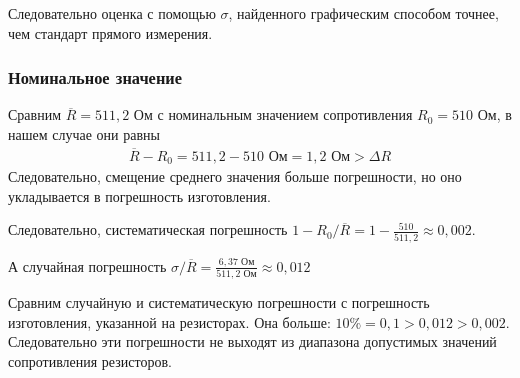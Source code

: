 Следовательно оценка с помощью $\sigma$, найденного графическим способом точнее, чем стандарт прямого измерения.

\subsubsection{Номинальное значение}

Сравним $\overline{R} = 511,2 \text{ Ом}$ с номинальным значением сопротивления $R_0 = 510 \text{ Ом}$, в нашем случае они равны
\begin{align*}
	\overline{R} - R_0 = 511,2 - 510 \text{ Ом} = 1,2 \text{ Ом} > \Delta R
\end{align*}
Следовательно, смещение среднего значения больше погрешности, но оно укладывается в погрешность изготовления.

Следовательно, систематическая погрешность $1 - R_0 / \overline{R} = 1 - \frac{510}{511,2} \approx 0,002$.

А случайная погрешность $\sigma / \overline{R} = \frac{6,37 \text{ Ом}}{511,2 \text{ Ом}} \approx 0,012 $

Сравним случайную и систематическую погрешности с погрешность изготовления, указанной на резисторах. Она больше: $ 10\% = 0,1 > 0,012 > 0,002 $. Следовательно эти погрешности не выходят из диапазона допустимых значений сопротивления резисторов.
